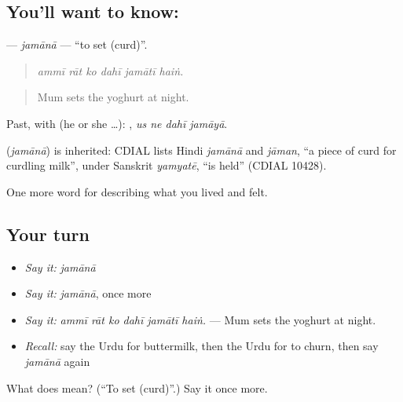 \subsection*{You'll want to know: }
\textbf{} — \emph{jamānā} — \textquotedblleft{}to set (curd)\textquotedblright{}.

\begin{quote}
     
\end{quote}

\begin{quote}
\emph{ammī rāt ko dahī jamātī haiṅ.}
\end{quote}

\begin{quote}
Mum sets the yoghurt at night.
\end{quote}

Past, with  (he or she …):    , \emph{us ne dahī jamāyā}.

\begin{cousinweb}
\textbf{} (\emph{jamānā}) is inherited: CDIAL lists Hindi \emph{jamānā} and \emph{jāman}, \textquotedblleft{}a piece of curd for curdling milk\textquotedblright{}, under Sanskrit \emph{yamyatē}, \textquotedblleft{}is held\textquotedblright{} (CDIAL 10428).
\end{cousinweb}

\begin{grammarlens}[title={What you've built}]
One more word for describing what you lived and felt.
\end{grammarlens}

\subsection*{Your turn}
\begin{itemize}
\raggedright
  \item \emph{Say it:} \emph{jamānā}
  \item \emph{Say it:} \emph{jamānā}, once more
  \item \emph{Say it:} \emph{ammī rāt ko dahī jamātī haiṅ.} — Mum sets the yoghurt at night.
  \item \emph{Recall:} say the Urdu for buttermilk, then the Urdu for to churn, then say \emph{jamānā} again
\end{itemize}

\begin{tcolorbox}[breakable,colback=teal!4,colframe=teal!35!black,title={Before you move on}]
What does  mean? (\textquotedblleft{}To set (curd)\textquotedblright{}.) Say it once more.
\end{tcolorbox}
